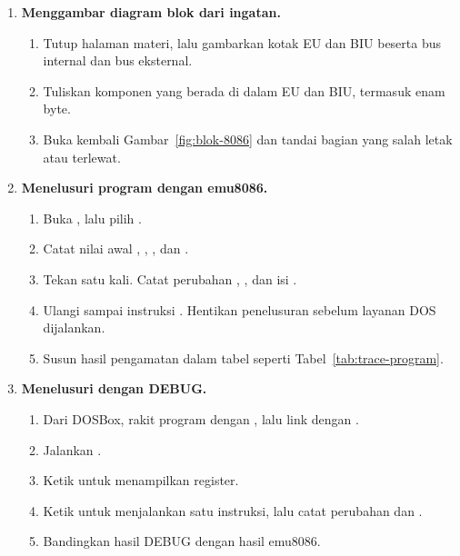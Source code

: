 \begin{enumerate}
    \item \textbf{Menggambar diagram blok dari ingatan.}
    \begin{enumerate}
        \item Tutup halaman materi, lalu gambarkan kotak EU dan BIU
              beserta bus internal dan bus eksternal.
        \item Tuliskan komponen yang berada di dalam EU dan BIU,
              termasuk  enam byte.
        \item Buka kembali Gambar~\ref{fig:blok-8086} dan tandai
              bagian yang salah letak atau terlewat.
    \end{enumerate}

    \item \textbf{Menelusuri program dengan emu8086.}
    \begin{enumerate}
        \item Buka , lalu pilih
              .
        \item Catat nilai awal , , , dan
              .
        \item Tekan  satu kali. Catat perubahan
              , , dan isi .
        \item Ulangi sampai instruksi . Hentikan
              penelusuran sebelum layanan DOS dijalankan.
        \item Susun hasil pengamatan dalam tabel seperti
              Tabel~\ref{tab:trace-program}.
    \end{enumerate}

    \item \textbf{Menelusuri dengan DEBUG.}
    \begin{enumerate}
        \item Dari DOSBox, rakit program dengan
              , lalu link dengan
              .
        \item Jalankan .
        \item Ketik  untuk menampilkan register.
        \item Ketik  untuk menjalankan satu instruksi, lalu
              catat perubahan  dan .
        \item Bandingkan hasil DEBUG dengan hasil emu8086.
    \end{enumerate}


\end{enumerate}
